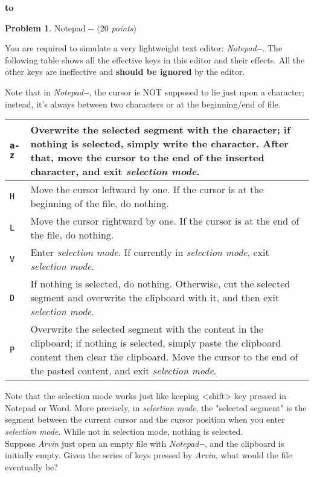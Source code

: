 \documentclass[12pt,a4paper]{report}
\newcommand{\points}[1]{ ($#1$ \textit{points}) }
\theoremstyle{definition}
\newtheorem{problem}{\textbf{Problem}}
\theoremstyle{definition}
\def\headline#1{\hbox to \hsize{\hrulefill\quad\lower.3em\hbox{#1}\quad\hrulefill}}
\def\headline#1{\hbox to \hsize{\hrulefill\quad\lower.3em\hbox{#1}\quad\hrulefill}}
\begin{document}
\newpage

\vspace{5pt}
\begin{center}
\textbf{\headline{\large Programming Part}}
\end{center}
\begin{problem}Notepad -{}- \points{20}

You are required to simulate a very lightweight text editor: \textit{Notepad-}-. The following table shows all the effective keys in this editor and their effects. All the other keys are ineffective and {\bfseries should be ignored} by the editor.

Note that in \textit{Notepad-}-, the cursor is NOT supposed to lie just upon a character; instead, it's always between two characters or at the beginning/end of file.


\begin{table}[h]
\centering
\begin{tabularx}{\textwidth}{|l|X|}
\hline
\texttt{a-z} & Overwrite the selected segment with the character; if nothing is selected, simply write the character. After that, move the cursor to the end of the inserted character, and exit \textit{selection mode}.\\\hline
\texttt{H}   & Move the cursor leftward by one. If the cursor is at the beginning of the file, do nothing.\\\hline
\texttt{L}   & Move the cursor rightward by one. If the cursor is at the end of the file, do nothing.\\\hline
\texttt{V}   & Enter \textit{selection mode}. If currently in \textit{selection mode}, exit \textit{selection mode}.\\\hline
\texttt{D}   & If nothing is selected, do nothing. Otherwise, cut the selected segment and overwrite the clipboard with it, and then exit \textit{selection mode}.\\\hline
\texttt{P}   & Overwrite the selected segment with the content in the clipboard; if nothing is selected, simply paste the clipboard content then clear the clipboard. Move the cursor to the end of the pasted content, and exit \textit{selection mode}.\\\hline
\end{tabularx}
\end{table}

Note that the selection mode works just like keeping <shift> key pressed in Notepad or Word. More precisely, in \textit{selection mode}, the "selected segment" is the segment between the current cursor and the cursor position when you enter \textit{selection mode}. While not in selection mode, nothing is selected.\\
Suppose \textit{Arvin} just open an empty file with \textit{Notepad-}-, and the clipboard is initially empty. Given the series of keys pressed by \textit{Arvin}, what would the file eventually be?\\


\end{problem}
\end{document}
